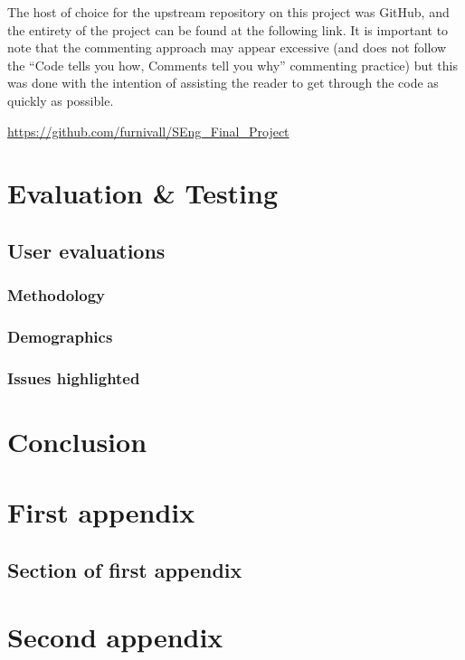 \documentclass{mproj}
\begin{document}
The host of choice for the upstream repository on this project was GitHub, and the entirety of the project can be found at the following link. It is important to note that the commenting approach may appear excessive (and does not follow the ``Code tells you how, Comments tell you why'' commenting practice) but this was done with the intention of assisting the reader to get through the code as quickly as possible.  

\href{https://github.com/furnivall/SEng_Final_Project}{https://github.com/furnivall/SEng\_Final\_Project}

\chapter{Evaluation \& Testing}\label{testing}
\section{User evaluations}
\subsection{Methodology}
\subsection{Demographics}
\subsection{Issues highlighted}
\chapter{Conclusion}\label{conclusion}
\appendix %
\chapter{First appendix}

\section{Section of first appendix}

\chapter{Second appendix}

\printbibliography
\end{document}
